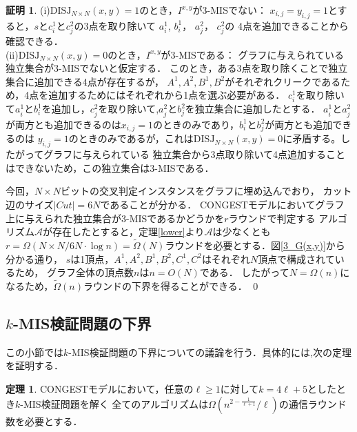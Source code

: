 \documentclass[11pt,a4paper]{jarticle}
\newcommand{\CONGEST}{\textsf{CONGEST}}
\theoremstyle{definition}
\newtheorem{theorem}{定理}[section]
\newtheorem*{prf*}{証明}
\begin{document}
\begin{prf*}
(i)$\mathrm{DISJ}_{N \times N} (x, y) = 1$のとき，$I^{x,y}$が3-MISでない： 
$x_{i, j} = y_{i, j} =1$とすると，$s$と$c_{i}^{1}$と$c_{j}^{2}$の3点を取り除いて
$a_{i}^{1}$, $b_{i}^{1}$， $a_{j}^{2}$， $c_{j}^{2}$の
4点を追加できることから確認できる． \\
(ii)$\mathrm{DISJ}_{N \times N} (x, y) = 0$のとき，$I^{x,y}$が3-MISである： 
グラフに与えられている独立集合が3-MISでないと仮定する．
このとき，ある3点を取り除くことで独立集合に追加できる4点が存在するが，
$A^{1}, A^{2}, B^{1}, B^{2}$がそれぞれクリークであるため，4点を追加するためにはそれぞれから1点を選ぶ必要がある．
$c_{i}^{1}$を取り除いて$a_{i}^{1}$と$b_{i}^{1}$を追加し，$c_{j}^{2}$を取り除いて,$a_{j}^{2}$と$b_{j}^{2}$を独立集合に追加したとする．
$a_{i}^{1}$と$a_{j}^{2}$が両方とも追加できるのは$x_{i, j} = 1$のときのみであり，$b_{i}^{1}$と$b_{j}^{2}$が両方とも追加できるのは
$y_{i, j} = 1$のときのみであるが，これは$\mathrm{DISJ}_{N \times N} (x, y) = 0$に矛盾する。したがってグラフに与えられている
独立集合から3点取り除いて4点追加することはできないため，この独立集合は3-MISである．

今回，$N \times N$ビットの交叉判定インスタンスをグラフに埋め込んでおり，
カット辺のサイズ$|\mathit{Cut}| = 6N$であることが分かる．
{\CONGEST}モデルにおいてグラフ上に与えられた独立集合が3-MISであるかどうかを$r$ラウンドで判定する
アルゴリズム$\mathcal{A}$が存在したとすると，定理\ref{lower}より$\mathcal{A}$は少なくとも
$r = \Omega (N \times N/ 6N \cdot \log n) = \tilde{\Omega}(N)$ラウンドを必要とする．図\ref{3_G(x,y)}から分かる通り，
$s$は1頂点，$A^{1}, A^{2}, B^{1}, B^{2}, C^{1}, C^{2}$はそれぞれ$N$頂点で構成されているため，
グラフ全体の頂点数$n$は$n = O(N)$である．
したがって$N = \Omega(n)$になるため，$\tilde{\Omega}(n)$ラウンドの下界を得ることができる． \qed
\end{prf*}
\newpage

\subsection{$k$-MIS検証問題の下界}
この小節では$k$-MIS検証問題の下界についての議論を行う．具体的には,次の定理を証明する．
\begin{theorem}
{\CONGEST}モデルにおいて，任意の$\ell \geq 1$に対して$k = 4\ell + 5$としたとき$k$-MIS検証問題を解く
全てのアルゴリズムは$\Omega\left(n^{2 - \frac{1}{\ell+1}}/\ell \right)$の通信ラウンド数を必要とする．
\end{theorem}
\end{document}
